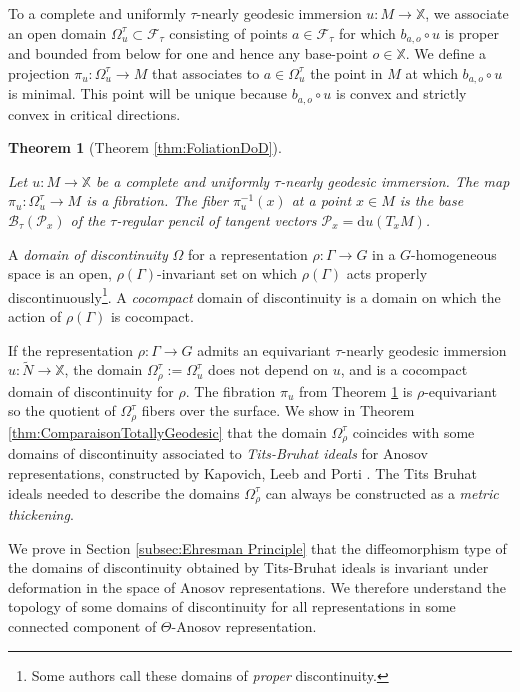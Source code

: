 \documentclass[reqno,10pt]{amsart}
\theoremstyle{plain}
\newtheorem{thm}{Theorem}[section]
\theoremstyle{definition}
\theoremstyle{remark}
\newcommand{\type}{\tau}
\newcommand{\X}{\mathbb{X}}
\begin{document}
\medskip

To a complete and uniformly $\type$-nearly geodesic immersion $u:M\to \X$, we associate an open domain $\Omega^\type_u\subset \mathcal{F}_\type$ consisting of points $a\in \mathcal{F}_\type$ for which $b_{a,o}\circ u$ is proper and bounded from below for one and hence any base-point $o\in \X$.
We define a projection $\pi_u:\Omega^\type_u\to M$ that associates to $a\in \Omega^\type_u$ the point in $M$ at which $b_{a,o}\circ u$ is minimal. This point will be unique because $b_{a,o}\circ u$ is convex and strictly convex in critical directions.

\begin{thm}[Theorem \ref{thm:FoliationDoD}]
\label{thm:FoliationDoDIntro}

Let $u:M\to \X$ be a complete and uniformly $\type$-nearly geodesic immersion. The map $\pi_u:\Omega^\type_u\to M$ is a fibration. The fiber $\pi_u^{-1}(x)$ at a point $x\in M$ is the base $\mathcal{B}_\type(\mathcal{P}_x)$ of the $\type$-regular pencil of tangent vectors $\mathcal{P}_x=\mathrm{d}u(T_xM)$.

\end{thm}

A \emph{domain of discontinuity} $\Omega$ for a representation $\rho:\Gamma\to G$ in a $G$-homogeneous space is an open, $\rho(\Gamma)$-invariant set on which $\rho(\Gamma)$ acts properly discontinuously\footnote{Some authors call these domains of \emph{proper} discontinuity.}. A \emph{cocompact} domain of discontinuity is a domain on which the action of $\rho(\Gamma)$ is cocompact.

\medskip

If the representation $\rho:\Gamma\to G$ admits an equivariant $\type$-nearly geodesic immersion $u:\widetilde{N}\to \X$, the domain $\Omega_\rho^\type:=\Omega_u^\type$ does not depend on $u$, and is a cocompact domain of discontinuity for $\rho$. The fibration $\pi_u$ from Theorem \ref{thm:FoliationDoDIntro} is $\rho$-equivariant so the quotient of $\Omega_\rho^\type$ fibers over the surface.
We show in Theorem \ref{thm:ComparaisonTotallyGeodesic} that the domain $\Omega^\type_\rho$ coincides with some domains of discontinuity associated to \emph{Tits-Bruhat ideals} for Anosov representations, constructed by Kapovich, Leeb and Porti \cite{KLP-DoD}. The Tits Bruhat ideals needed to describe the domains $\Omega^\type_\rho$ can always be constructed as a \emph{metric thickening}.

\medskip

We prove in Section \ref{subsec:Ehresman Principle} that the diffeomorphism type of the domains of discontinuity obtained by Tits-Bruhat ideals is invariant under deformation in the space of Anosov representations. We therefore understand the topology of some domains of discontinuity for all representations in some connected component of $\Theta$-Anosov representation.
\end{document}
